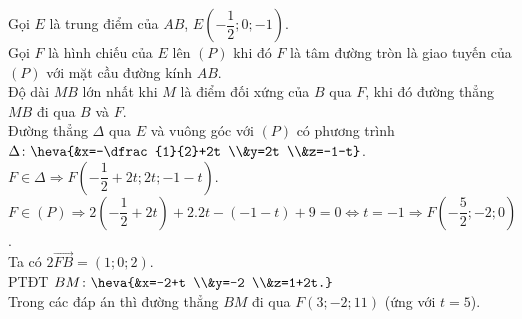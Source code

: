 \begin{ex}
{\begin{center}
\begin{tikzpicture}[>=stealth,line join=round,line cap=round,font=\footnotesize,scale=0.8]
			\end{tikzpicture}
		\end{center}
		Gọi $E$ là trung điểm của $AB$, $E\left( -\dfrac{1}{2};0;-1 \right)$.\\
		Gọi $F$ là hình chiếu của $E$ lên $(P)$ khi đó $F$ là tâm đường tròn là giao tuyến của $(P)$ với mặt cầu đường kính $AB$.\\
		Độ dài $MB$ lớn nhất khi $M$ là điểm đối xứng của $B$ qua $F$, khi đó đường thẳng $MB$ đi qua $B$ và $F$.\\
		Đường thẳng $\Delta $ qua $E$ và vuông góc với $(P)$ có phương trình $\Delta \colon \heva{&x=-\dfrac{1}{2}+2t \\&y=2t \\&z=-1-t}$.\\
		$F \in \Delta \Rightarrow F\left( -\dfrac12+2t;2t;-1-t \right)$.\\
		$F \in (P) \Rightarrow 2\left( -\dfrac{1}{2}+2t \right)+2.2t-\left( -1-t \right)+9=0\Leftrightarrow t=-1\Rightarrow F\left( -\dfrac{5}{2};-2;0 \right)$.\\
		Ta có $2\overrightarrow{FB}=\left( 1;0;2 \right)$.\\
		PTĐT $BM \colon \heva{&x=-2+t \\&y=-2 \\&z=1+2t.}$\\
		Trong các đáp án thì đường thẳng $BM$ đi qua $F\left( 3;-2;11 \right)$ (ứng với $t=5$).}
\end{ex}


